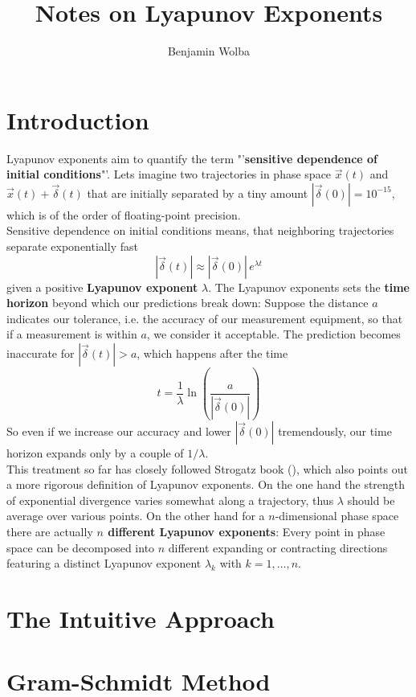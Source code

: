 \documentclass{article}
\title{Notes on Lyapunov Exponents}
\author{Benjamin Wolba}
\begin{document}
\maketitle


\section{Introduction}

Lyapunov exponents aim to quantify the term "'\textbf{sensitive dependence of initial conditions}"'. Lets imagine two trajectories in phase space $\vec{x}(t)$ and $\vec{x}(t) + \vec{\delta}(t)$ that are initially separated by a tiny amount $|\vec{\delta}(0)| = 10^{-15}$, which is of the order of floating-point precision. \\
\indent Sensitive dependence on initial conditions means, that neighboring trajectories separate exponentially fast
%
\begin{equation}
|\vec{\delta}(t)| \approx |\vec{\delta}(0)| \, e^{\lambda t} 
\label{expincrease}
\end{equation}
%
given a positive \textbf{Lyapunov exponent} $\lambda$. The Lyapunov exponents sets the \textbf{time horizon} beyond which our predictions break down: Suppose the distance $a$ indicates our tolerance, i.e. the accuracy of our measurement equipment, so that if a measurement is within $a$, we consider it acceptable. The prediction becomes inaccurate for $|\vec{\delta}(t)| > a$, which happens after the time
%
\begin{equation}
t = \frac{1}{\lambda} \ln \left( \frac{a}{|\vec{\delta}(0)|} \right)
\label{timehorizon}
\end{equation}
% 
So even if we increase our accuracy and lower $|\vec{\delta}(0)|$ tremendously, our time horizon expands only by a couple of $1/\lambda$. \\
\indent This treatment so far has closely followed Strogatz book (\cite[chapter 9.3]{Strogatz1994}), which also points out a more rigorous definition of Lyapunov exponents. On the one hand the strength of exponential divergence varies somewhat along a trajectory, thus $\lambda$ should be average over various points. On the other hand for a $n$-dimensional phase space there are actually \textbf{$n$ different Lyapunov exponents}: Every point in phase space can be decomposed into $n$ different expanding or contracting directions featuring a distinct Lyapunov exponent $\lambda_k$ with $k = 1, \dots, n$. \\



\section{The Intuitive Approach}



\section{Gram-Schmidt Method}




\nocite{*}
\printbibliography
\end{document}
